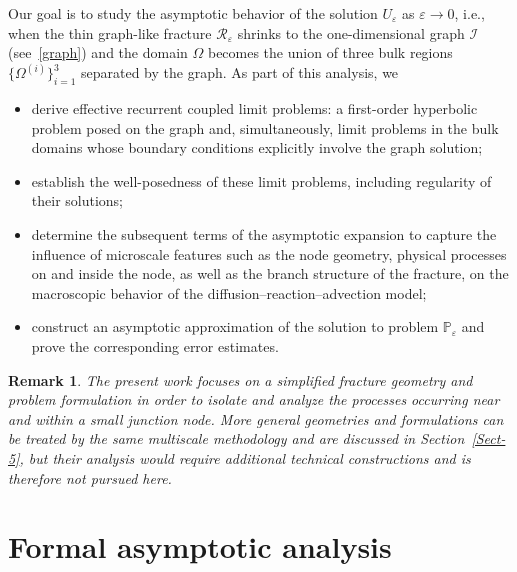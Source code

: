 \documentclass[reqno]{amsart}            %
\newtheorem{remark}{Remark}[section]
\numberwithin{equation}{section}
\begin{document}
	Our goal is to study the asymptotic behavior of the solution $U_\varepsilon$ as
	$\varepsilon\to0$, i.e., when the thin graph-like fracture $\mathcal{R}_\varepsilon$ shrinks to the one-dimensional graph
	$\mathcal{I}$ (see~\eqref{graph}) and 
	the domain $\Omega$ becomes the union of three bulk regions $\{\Omega^{(i)}\}_{i=1}^3$
	separated by the graph. As part of this analysis, we
	\begin{itemize}
		\item 
		derive effective recurrent coupled limit problems: a first-order hyperbolic problem posed on the graph and, simultaneously, limit problems in the bulk domains whose boundary conditions explicitly involve the graph solution;
		\item 
		establish the well-posedness of these limit problems, including regularity of their solutions;
		\item 
		determine the subsequent terms of the asymptotic expansion to capture the influence of microscale features such as the node geometry, physical processes on and inside the node, as well as the branch structure of the fracture, on the macroscopic behavior of the diffusion–reaction–advection model;
		\item 
		construct an asymptotic approximation of the solution to problem $\mathbb{P}_\varepsilon$ and prove the corresponding error estimates.
	\end{itemize}
	
	\begin{remark}
		The present work focuses on a simplified fracture geometry and problem
		formulation in order to isolate and analyze the processes occurring near and
		within a small junction node. More general geometries and formulations can be
		treated by the same multiscale methodology and are discussed in Section~\ref{Sect-5}, but their analysis would require additional technical constructions
		and is therefore not pursued here.
	\end{remark}
	
	
	
	
	\section{Formal asymptotic analysis}\label{Sect-3}
	
\end{document}
